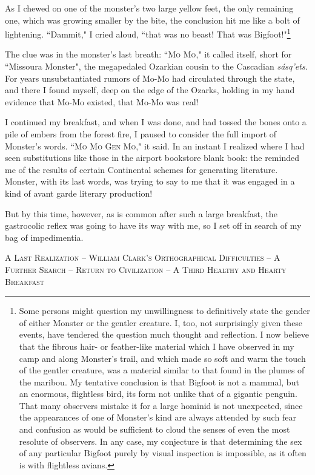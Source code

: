 \par
As I chewed on one of the monster's two large yellow feet, the only remaining one, which was growing smaller by the bite, the conclusion hit me like a bolt of lightening.  ``Dammit," I cried aloud, ``that was no beast!  That was Bigfoot!"\footnote{Some persons might question my unwillingness to definitively state the gender of either Monster or the gentler creature.  I, too, not surprisingly given these events, have tendered the question much thought and reflection.  I now believe that the fibrous hair- or feather-like material which I have observed in my camp and along Monster's trail, and which made so soft and warm the touch of the gentler creature, was a material similar to that found in the plumes of the maribou.  My tentative conclusion is that Bigfoot is not a mammal, but an enormous, flightless bird, its form not unlike that of a gigantic penguin.  That many observers mistake it for a large hominid is not unexpected, since the appearances of one of Monster's kind are always attended by such fear and confusion as would be sufficient to cloud the senses of even the most resolute of observers.  In any case, my conjecture is that determining the sex of any particular Bigfoot purely by visual inspection is impossible, as it often is with flightless avians.}
\par
The clue was in the monster's last breath: ``\textsc{Mo Mo}," it called itself, short for ``Missoura Monster", the megapedaled Ozarkian cousin to the Cascadian \textit{sásq'ets}.  For years unsubstantiated rumors of Mo-Mo had circulated through the state, and there I found myself, deep on the edge of the Ozarks, holding in my hand evidence that Mo-Mo existed, that Mo-Mo was real!
\par
I continued my breakfast, and when I was done, and had tossed the bones onto a pile of embers from the forest fire, I paused to consider the full import of Monster's words.  ``\textsc{Mo Mo Gen Mo}," it said.  In an instant I realized where I had seen substitutions like those in the airport bookstore blank book: the reminded me of the results of certain Continental schemes for generating literature.  Monster, with its last words, was trying to say to me that it was engaged in a kind of avant garde literary production!
\par
But by this time, however, as is common after such a large breakfast, the gastrocolic reflex was going to have its way with me, so I set off in search of my bag of impedimentia.
\par
\begin{center}
\textsc{A Last Realization – William Clark's Orthographical Difficulties – A Further Search – Return to Civilization – A Third Healthy and Hearty Breakfast}
\end{center}
